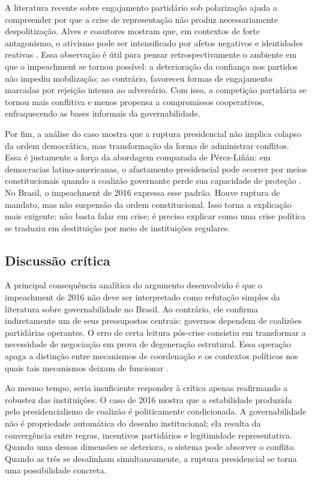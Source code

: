 \documentclass[12pt,a4paper]{article}
\begin{document}
A literatura recente sobre engajamento partidário sob polarização ajuda a compreender por que a crise de representação não produz necessariamente despolitização. Alves e coautores mostram que, em contextos de forte antagonismo, o ativismo pode ser intensificado por afetos negativos e identidades reativas \textcite{alves2024_rage_within}. Essa observação é útil para pensar retrospectivamente o ambiente em que o impeachment se tornou possível: a deterioração da confiança nos partidos não impediu mobilização; ao contrário, favoreceu formas de engajamento marcadas por rejeição intensa ao adversário. Com isso, a competição partidária se tornou mais conflitiva e menos propensa a compromissos cooperativos, enfraquecendo as bases informais da governabilidade.

Por fim, a análise do caso mostra que a ruptura presidencial não implica colapso da ordem democrática, mas transformação da forma de administrar conflitos. Essa é justamente a força da abordagem comparada de Pérez-Liñán: em democracias latino-americanas, o afastamento presidencial pode ocorrer por meios constitucionais quando a coalizão governante perde sua capacidade de proteção \textcite{perez_lian2016_explaining_military}. No Brasil, o impeachment de 2016 expressa esse padrão. Houve ruptura de mandato, mas não suspensão da ordem constitucional. Isso torna a explicação mais exigente: não basta falar em crise; é preciso explicar como uma crise política se traduziu em destituição por meio de instituições regulares.

\subsection{Discussão crítica}
\label{sec:orgecc7a3c}
A principal consequência analítica do argumento desenvolvido é que o impeachment de 2016 não deve ser interpretado como refutação simples da literatura sobre governabilidade no Brasil. Ao contrário, ele confirma indiretamente um de seus pressupostos centrais: governos dependem de coalizões partidárias operantes. O erro de certa leitura pós-crise consistiu em transformar a necessidade de negociação em prova de degeneração estrutural. Essa operação apaga a distinção entre mecanismos de coordenação e os contextos políticos nos quais tais mecanismos deixam de funcionar \textcite{limongi2017_a_crise}.

Ao mesmo tempo, seria insuficiente responder à crítica apenas reafirmando a robustez das instituições. O caso de 2016 mostra que a estabilidade produzida pelo presidencialismo de coalizão é politicamente condicionada. A governabilidade não é propriedade automática do desenho institucional; ela resulta da convergência entre regras, incentivos partidários e legitimidade representativa. Quando uma dessas dimensões se deteriora, o sistema pode absorver o conflito. Quando as três se desalinham simultaneamente, a ruptura presidencial se torna uma possibilidade concreta.
\end{document}
